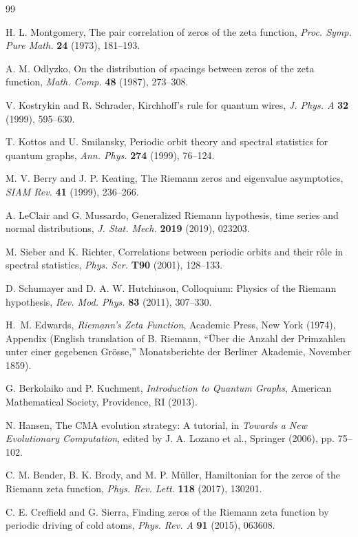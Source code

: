 \documentclass[cntp]{ipart}
\theoremstyle{plain}
\theoremstyle{remark}
\begin{document}

\begin{thebibliography}{99}

H. L. Montgomery,
The pair correlation of zeros of the zeta function,
\textit{Proc. Symp. Pure Math.} \textbf{24} (1973), 181--193.

A. M. Odlyzko,
On the distribution of spacings between zeros of the zeta function,
\textit{Math. Comp.} \textbf{48} (1987), 273--308.

V. Kostrykin and R. Schrader,
Kirchhoff's rule for quantum wires,
\textit{J. Phys. A} \textbf{32} (1999), 595--630.

T. Kottos and U. Smilansky,
Periodic orbit theory and spectral statistics for quantum graphs,
\textit{Ann. Phys.} \textbf{274} (1999), 76--124.

M. V. Berry and J. P. Keating,
The Riemann zeros and eigenvalue asymptotics,
\textit{SIAM Rev.} \textbf{41} (1999), 236--266.

A. LeClair and G. Mussardo,
Generalized Riemann hypothesis, time series and normal distributions,
\textit{J. Stat. Mech.} \textbf{2019} (2019), 023203.

M. Sieber and K. Richter,
Correlations between periodic orbits and their r\^ole in spectral statistics,
\textit{Phys. Scr.} \textbf{T90} (2001), 128--133.

D. Schumayer and D. A. W. Hutchinson,
Colloquium: Physics of the Riemann hypothesis,
\textit{Rev. Mod. Phys.} \textbf{83} (2011), 307--330.

H.~M. Edwards,
\textit{Riemann's Zeta Function},
Academic Press, New York (1974),
Appendix (English translation of B. Riemann,
``\"Uber die Anzahl der Primzahlen unter einer gegebenen Gr\"osse,''
Monatsberichte der Berliner Akademie, November 1859).

G. Berkolaiko and P. Kuchment,
\textit{Introduction to Quantum Graphs},
American Mathematical Society, Providence, RI (2013).

N. Hansen,
The CMA evolution strategy: A tutorial,
in \textit{Towards a New Evolutionary Computation}, edited by J. A. Lozano et al.,
Springer (2006), pp. 75--102.

C. M. Bender, B. K. Brody, and M. P. M\"uller,
Hamiltonian for the zeros of the Riemann zeta function,
\textit{Phys. Rev. Lett.} \textbf{118} (2017), 130201.

C. E. Creffield and G. Sierra,
Finding zeros of the Riemann zeta function by periodic driving of cold atoms,
\textit{Phys. Rev. A} \textbf{91} (2015), 063608.

\end{thebibliography}
\end{document}

